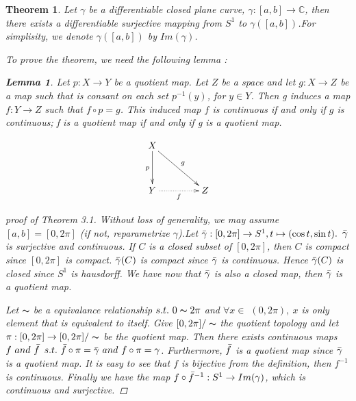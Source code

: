 \documentclass[11pt]{article}
\newtheorem{theorem}{Theorem}
\newtheorem{lemma}{Lemma}
\numberwithin{equation}{section} \numberwithin{theorem}{section}
\numberwithin{lemma}{section} \numberwithin{remark}{section}
\numberwithin{table}{section} \numberwithin{corollary}{section}
\numberwithin{example}{section} \numberwithin{conjecture}{section}
\numberwithin{assumption}{section}
\numberwithin{definition}{section}
\numberwithin{proposition}{section}
\begin{document}
\begin{theorem}
Let $\gamma$ be a differentiable closed plane curve, $\gamma:[a,b]\rightarrow \mathbb{C}$, then there exists a  differentiable surjective mapping from $S^1$ to $\gamma([a,b])$.For simplisity, we denote $\gamma([a,b])$ by $Im(\gamma)$.

To prove the theorem, we need the following lemma :

\begin{lemma}\cite[Theorem 22.2]{munkrestopology}
Let $p:X\rightarrow Y$ be a quotient map. Let $Z$ be a space and let $g:X\rightarrow Z$ be a map such that is consant on each set $p^{-1}({y})$, for $y\in Y$. Then g induces a map $f:Y\rightarrow Z$ such that $f \circ p =g$. This induced map $f$  is continuous if and only if $g$ is continuous; f is a quotient map if and only if g is a quotient map.
\end{lemma}
\[ 
\xymatrix@C=1.4cm@R=1.2cm{X\ar[rd]^{g}\ar[d]_{p}& \quad \\Y\ar@{.>}[r]_{f} & Z
}\]

\begin{proof}[proof of Theorem 3.1]
    Without loss of generality, we may assume $[a,b]=[0,2\pi]$ (if not, reparametrize $\gamma$).Let $\Bar{\gamma}:[0,2\pi]\rightarrow S^1,t\mapsto (\cos t,\sin t).$ $\Bar{\gamma}$ is surjective and continuous. If $C$ is a closed subset of $[0,2\pi]$, then $C$ is compact since  $[0,2\pi]$ is compact. $\Bar{\gamma}(C)$ is compact since $\Bar{\gamma}$ is continuous. Hence $\Bar{\gamma}(C)$ is closed since $S^1$ is hausdorff. We have now that $\Bar{\gamma}$ is also a closed map, then $\Bar{\gamma}$ is a quotient map.

    Let$\ \thicksim \ $be a equivalance relationship $s.t.\  0 \thicksim 2\pi$ and $\forall x\in $ $ (0,2 \pi),\ x$ is only element that is  equivalent to itself. Give $[0,2\pi]/\thicksim $ the quotient topology and let  $\pi:[0,2\pi]\rightarrow [0,2\pi]/\thicksim $ be the quotient map. Then there exists continuous maps $f \ and\  \Bar{f}$ $s.t. \ \Bar{f} \circ \pi =\Bar{\gamma} \ and \ f \circ \pi =\gamma$. Furthermore, $\Bar{f}$ is a quotient map since $\Bar{\gamma}$ is a quotient map. It is easy to see that $f$ is bijective from the definition, then $f^{-1}$ is continuous. 
    Finally we have the map $f\circ \Bar{f}^{-1}:S^1\rightarrow Im(\gamma) $, which is continuous and surjective. 
    

\end{proof}
\end{theorem}
\end{document}
